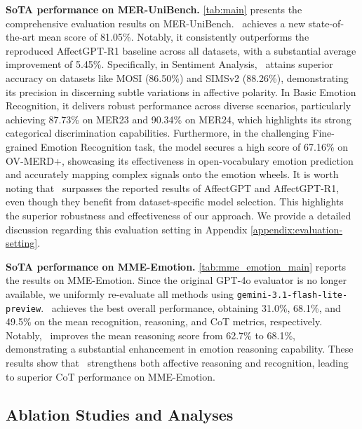 \documentclass{article}
\theoremstyle{plain}
\theoremstyle{definition}
\theoremstyle{remark}
\begin{document}
\noindent\textbf{SoTA performance on MER-UniBench.}
\cref{tab:main} presents the comprehensive evaluation results on MER-UniBench. \ourmethod~achieves a new state-of-the-art mean score of 81.05\%. Notably, it consistently outperforms the reproduced AffectGPT-R1 baseline across all datasets, with a substantial average improvement of 5.45\%.
Specifically, in Sentiment Analysis, \ourmethod~attains superior accuracy on datasets like MOSI (86.50\%) and SIMSv2 (88.26\%), demonstrating its precision in discerning subtle variations in affective polarity.
In Basic Emotion Recognition, it delivers robust performance across diverse scenarios, particularly achieving 87.73\% on MER23 and 90.34\% on MER24, which highlights its strong categorical discrimination capabilities.
Furthermore, in the challenging Fine-grained Emotion Recognition task, the model secures a high score of 67.16\% on OV-MERD+, showcasing its effectiveness in open-vocabulary emotion prediction and accurately mapping complex signals onto the emotion wheels.
It is worth noting that \ourmethod~surpasses the reported results of AffectGPT and AffectGPT-R1, even though they benefit from dataset-specific model selection. This highlights the superior robustness and effectiveness of our approach. We provide a detailed discussion regarding this evaluation setting in Appendix \ref{appendix:evaluation-setting}.


\noindent\textbf{SoTA performance on MME-Emotion.}
\cref{tab:mme_emotion_main} reports the results on MME-Emotion. Since the original GPT-4o evaluator is no longer available, we uniformly re-evaluate all methods using \texttt{gemini-3.1-flash-lite-preview}.
\ourmethod~achieves the best overall performance, obtaining 31.0\%, 68.1\%, and 49.5\% on the mean recognition, reasoning, and CoT metrics, respectively.
Notably, \ourmethod~improves the mean reasoning score from 62.7\% to 68.1\%, demonstrating a substantial enhancement in emotion reasoning capability.
These results show that \ourmethod~strengthens both affective reasoning and recognition, leading to superior CoT performance on MME-Emotion.







\subsection{Ablation Studies and Analyses}
\label{sec:ablation}
\end{document}
